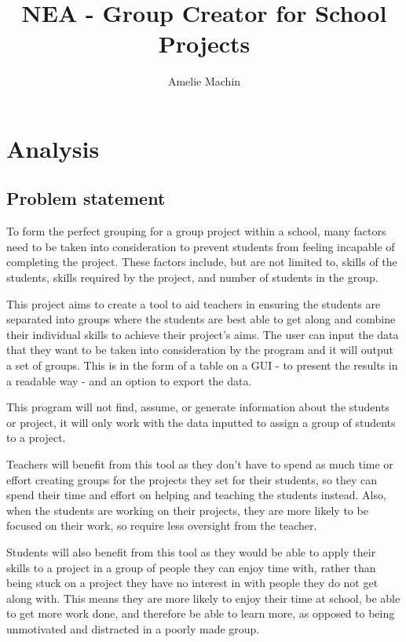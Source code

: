 \documentclass{article}
\title{NEA - Group Creator for School Projects}
\author{Amelie Machin}
\date{}
\begin{document}
\maketitle
\tableofcontents

\section{Analysis}
\subsection{Problem statement}
To form the perfect grouping for a group project within a school, many factors need to be taken into consideration to prevent students from feeling incapable of completing the project. These factors include, but are not limited to, skills of the students, skills required by the project, and number of students in the group.

This project aims to create a tool to aid teachers in ensuring the students are separated into groups where the students are best able to get along and combine their individual skills to achieve their project's aims. The user can input the data that they want to be taken into consideration by the program and it will output a set of groups. This is in the form of a table on a GUI - to present the results in a readable way - and an option to export the data.

This program will not find, assume, or generate information about the students or project, it will only work with the data inputted to assign a group of students to a project.

Teachers will benefit from this tool as they don't have to spend as much time or effort creating groups for the projects they set for their students, so they can spend their time and effort on helping and teaching the students instead. Also, when the students are working on their projects, they are more likely to be focused on their work, so require less oversight from the teacher.

Students will also benefit from this tool as they would be able to apply their skills to a project in a group of people they can enjoy time with, rather than being stuck on a project they have no interest in with people they do not get along with. This means they are more likely to enjoy their time at school, be able to get more work done, and therefore be able to learn more, as opposed to being unmotivated and distracted in a poorly made group.
\end{document}
